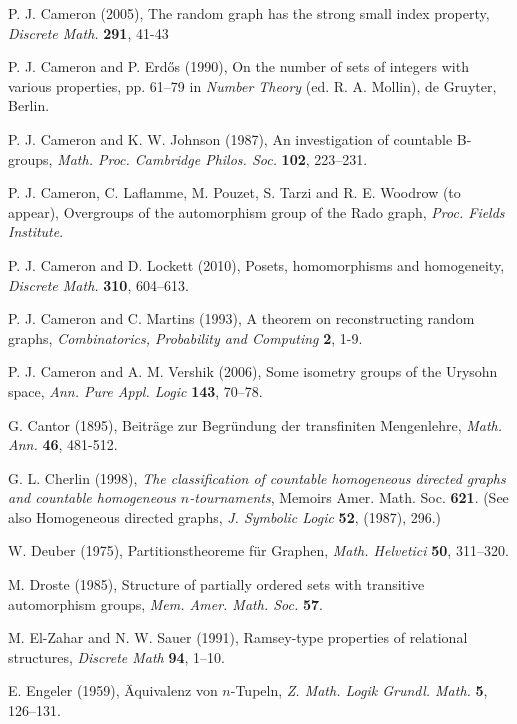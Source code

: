 \documentclass{book}
\begin{document}
\begin{thebibliography}{99}
P. J. Cameron (2005),
The random graph has the strong small index property,
\textit{Discrete Math.} \textbf{291}, 41-43

 P. J. Cameron and P. Erd\H{o}s (1990), On the number of sets of integers with
various properties, pp. 61--79 in \textit{Number Theory} (ed. R. A.
Mollin), de Gruyter, Berlin.

 P. J. Cameron and K. W. Johnson (1987), An investigation of countable B-groups, \textit{Math. Proc. Cambridge Philos. Soc.} \textbf{102}, 223--231.

P. J. Cameron, C. Laflamme, M. Pouzet, S. Tarzi and R. E. Woodrow (to appear),
Overgroups of the automorphism group of the Rado graph,
\textit{Proc. Fields Institute}.

P. J. Cameron and D. Lockett (2010),
Posets, homomorphisms and homogeneity,
\textit{Discrete Math.} \textbf{310}, 604--613.

P. J. Cameron and C. Martins (1993),
A theorem on reconstructing random graphs,
\textit{Combinatorics, Probability and Computing} \textbf{2}, 1-9.

P. J. Cameron and A. M. Vershik (2006),
Some isometry groups of the Urysohn space,
\textit{Ann. Pure Appl. Logic} \textbf{143}, 70--78.

G. Cantor (1895),
Beitr\"{a}ge zur Begr\"{u}ndung der transfiniten Mengenlehre,
\textit{Math. Ann.} \textbf{46}, 481-512.

G. L. Cherlin (1998),
\textit{The classification of countable homogeneous directed graphs and
countable homogeneous $n$-tournaments},
Memoirs Amer. Math. Soc. \textbf{621}.
(See also Homogeneous directed graphs, \textit{J. Symbolic Logic} \textbf{52},
(1987), 296.)

W. Deuber (1975),
Partitionstheoreme f\"{u}r Graphen,
\textit{Math. Helvetici} \textbf{50}, 311--320.

M. Droste (1985),
Structure of partially ordered sets with transitive automorphism groups,
\textit{Mem. Amer. Math. Soc.} \textbf{57}.

M. El-Zahar and N. W. Sauer (1991),
Ramsey-type properties of relational structures,
\textit{Discrete Math} \textbf{94}, 1--10.

E. Engeler (1959),
\"{A}quivalenz von $n$-Tupeln,
\textit{Z. Math. Logik Grundl. Math.} \textbf{5}, 126--131.


\end{thebibliography}
\end{document}
